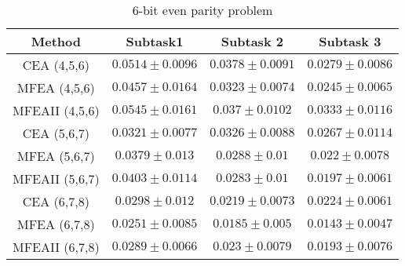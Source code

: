 \begin{table}
    \caption{6-bit even parity problem}
    \begin{center}
    \begin{tabular}{|c|c|c|c|}
    \hline
    \multirow{1}{*}{\textbf{Method}} & \multicolumn{1}{c|}{\textbf{Subtask1}} & \multicolumn{1}{c|}{\textbf{Subtask 2}} & \multicolumn{1}{c|}{\textbf{Subtask 3}} \\ \hline
    CEA (4,5,6) & $0.0514 \pm 0.0096$ & $0.0378 \pm 0.0091$ & $0.0279 \pm 0.0086$ \\ 
    MFEA (4,5,6) & $\mathbf{0.0457 \pm 0.0164}$ & $\mathbf{0.0323 \pm 0.0074}$ & $\mathbf{0.0245 \pm 0.0065}$ \\ 
    MFEAII (4,5,6)  & $0.0545 \pm 0.0161$ & $0.037 \pm 0.0102$ & $0.0333 \pm 0.0116$ \\ \hline
    CEA (5,6,7) & $\mathbf{0.0321 \pm 0.0077}$ & $0.0326 \pm 0.0088$ & $0.0267 \pm 0.0114$  \\ 
    MFEA (5,6,7) & $0.0379 \pm 0.013$ & $0.0288 \pm 0.01$ & $0.022 \pm 0.0078$ \\ 
    MFEAII (5,6,7)  &$ 0.0403 \pm 0.0114$ &$\mathbf{ 0.0283 \pm 0.01} $& $\mathbf{0.0197 \pm 0.0061}$ \\ \hline
    CEA (6,7,8) & $0.0298 \pm 0.012$ & $0.0219 \pm 0.0073$ & $0.0224 \pm 0.0061$ \\ 
    MFEA (6,7,8) & $\mathbf{0.0251 \pm 0.0085}$ & $\mathbf{0.0185 \pm 0.005}$ & $\mathbf{0.0143 \pm 0.0047}$ \\ 
    MFEAII (6,7,8)  &$ 0.0289 \pm 0.0066$ &$ 0.023 \pm 0.0079$ & $0.0193 \pm 0.0076$ \\ \hline
    
    \end{tabular}
    \end{center}
    
    \label{tab:result:nbit}
    

\end{table}

